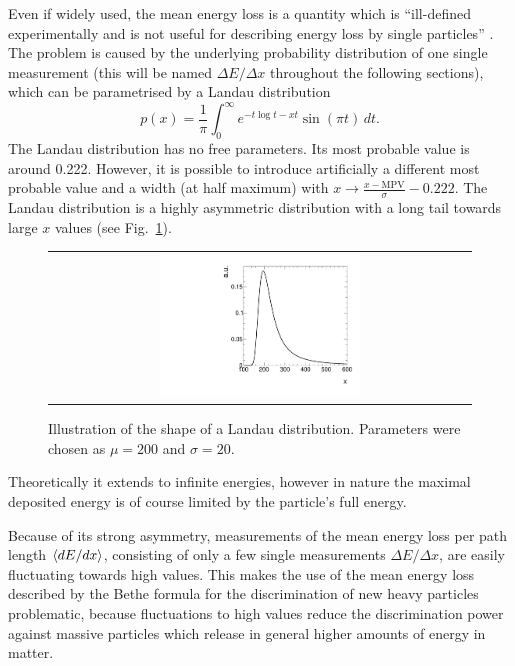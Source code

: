 Even if widely used, the mean energy loss is a quantity which is ``ill-defined experimentally and is not useful for describing energy loss by single particles'' \cite{bib:PDG_2014}.
The problem is caused by the underlying probability distribution of one single \dedx measurement (this will be named $\Delta E/ \Delta x $ throughout the following sections), which can be parametrised by a Landau distribution \cite{bib:Landau_1944}
\begin{equation}
p(x) = \frac{1}{\pi} \int_0^\infty\! e^{-t \log t - x t} \sin(\pi t)\, dt.
\end{equation}
The Landau distribution has no free parameters. Its most probable value is around 0.222.
However, it is possible to introduce artificially a different most probable value and a width (at half maximum) with $x \rightarrow \frac{x-\text{MPV}}{\sigma}-0.222$.
The Landau distribution is a highly asymmetric distribution with a long tail towards large $x$ values (see Fig.~\ref{fig:landau}).
\begin{figure}[!t]
  \centering 
  \begin{tabular}{c}
  \includegraphics[width=0.49\textwidth]{figures/analysis/PixelCalibration/Landau.pdf}
  \end{tabular}
  \caption{Illustration of the shape of a Landau distribution. Parameters were chosen as $\mu=200$ and $\sigma=20$.} 
  \label{fig:landau}
\end{figure}
Theoretically it extends to infinite energies, however in nature the maximal deposited energy is of course limited by the particle's full energy.

Because of its strong asymmetry, measurements of the mean energy loss per path length $\langle dE/dx \rangle$, consisting of only a few single measurements $\Delta E/ \Delta x $, are easily fluctuating towards high values.
This makes the use of the mean energy loss described by the Bethe formula for the discrimination of new heavy particles problematic, because fluctuations to high values reduce the discrimination power against massive particles which release in general higher amounts of energy in matter.

